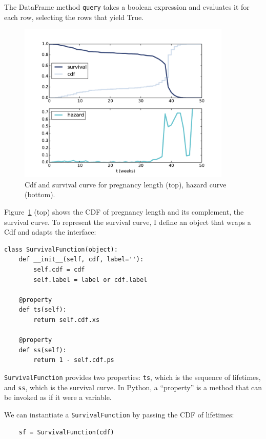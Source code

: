 \documentclass[12pt]{book}
\begin{document}
The DataFrame method {\tt query} takes a boolean expression and
evaluates it for each row, selecting the rows that yield True.

\begin{figure}
\centerline{\includegraphics[height=3.0in]{figs/survival1.pdf}}
\caption{Cdf and survival curve for pregnancy length (top),
hazard curve (bottom).}
\label{survival1}
\end{figure}

Figure~\ref{survival1} (top) shows the CDF of pregnancy length
and its complement, the survival curve.  To represent the
survival curve, I define an object that wraps a Cdf and 
adapts the interface:

\begin{verbatim}
class SurvivalFunction(object):
    def __init__(self, cdf, label=''):
        self.cdf = cdf
        self.label = label or cdf.label

    @property
    def ts(self):
        return self.cdf.xs

    @property
    def ss(self):
        return 1 - self.cdf.ps
\end{verbatim}

{\tt SurvivalFunction} provides two properties: {\tt ts}, which
is the sequence of lifetimes, and {\tt ss}, which is the survival
curve.  In Python, a ``property'' is a method that can be
invoked as if it were a variable.

We can instantiate a {\tt SurvivalFunction} by passing
the CDF of lifetimes:

\begin{verbatim}
    sf = SurvivalFunction(cdf)
\end{verbatim}
\end{document}
